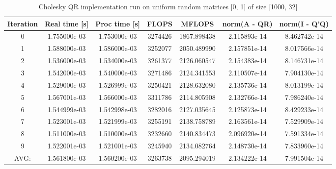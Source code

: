 \documentclass[11pt]{article}
\begin{document}
\begin{table}
  \centering

  \caption{Cholesky QR implementation run on uniform random matrices [0, 1] of size [1000, 32]}
  \vspace{3mm}

  \label{tab:chol_qr_1000}

  \begin{tabular}{c c c c c c c}
    Iteration & Real time [s] & Proc time [s] & FLOPS & MFLOPS & norm(A - QR) & norm(I - Q'Q) \\ \hline
    0 & 1.755000e-03 & 1.753000e-03 & 3274426 & 1867.898438 & 2.115893e-14 & 8.462742e-14 \\
    1 & 1.588000e-03 & 1.586000e-03 & 3252077 & 2050.489990 & 2.157851e-14 & 8.017566e-14 \\
    2 & 1.536000e-03 & 1.534000e-03 & 3261377 & 2126.060547 & 2.154383e-14 & 8.146731e-14 \\
    3 & 1.542000e-03 & 1.540000e-03 & 3271486 & 2124.341553 & 2.110507e-14 & 7.904130e-14 \\
    4 & 1.529000e-03 & 1.526999e-03 & 3250421 & 2128.632080 & 2.135736e-14 & 8.013199e-14 \\
    5 & 1.567001e-03 & 1.566000e-03 & 3311786 & 2114.805908 & 2.132766e-14 & 7.986240e-14 \\
    6 & 1.544999e-03 & 1.542998e-03 & 3282016 & 2127.035645 & 2.125873e-14 & 8.429233e-14 \\
    7 & 1.523001e-03 & 1.521999e-03 & 3255191 & 2138.758789 & 2.163561e-14 & 7.529909e-14 \\
    8 & 1.511000e-03 & 1.510000e-03 & 3232660 & 2140.834473 & 2.096920e-14 & 7.591334e-14 \\
    9 & 1.522001e-03 & 1.521001e-03 & 3245940 & 2134.082764 & 2.148730e-14 & 7.833960e-14 \\ \hline
    AVG: & 1.561800e-03 & 1.560200e-03 & 3263738 & 2095.294019 & 2.134222e-14 & 7.991504e-14 \\
  \end{tabular}
\end{table}
\end{document}
